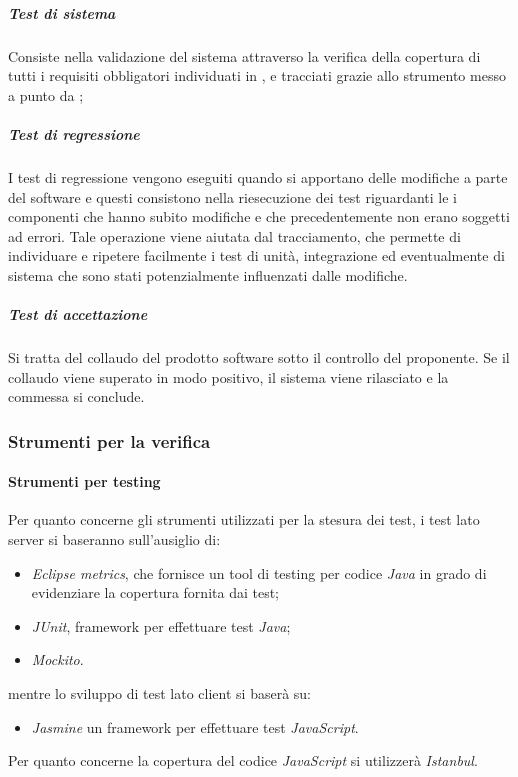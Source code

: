 \subparagraph{Test di sistema}
Consiste nella validazione del sistema attraverso la verifica della copertura di tutti i requisiti obbligatori individuati in \infoAR, e tracciati  grazie allo strumento messo a punto da \gruppo;
\subparagraph{Test di regressione}
I test di regressione vengono eseguiti quando si apportano delle modifiche a parte del software e questi consistono nella riesecuzione dei test riguardanti le i componenti che hanno subito modifiche e che precedentemente non erano soggetti ad errori.
Tale operazione viene aiutata dal tracciamento, che permette di individuare e ripetere facilmente i test di unità, integrazione ed eventualmente di sistema che sono stati potenzialmente influenzati dalle modifiche.
\subparagraph{Test di accettazione}
Si tratta del collaudo del prodotto software sotto il controllo del proponente. Se il collaudo viene superato in modo positivo, il sistema viene rilasciato e la commessa si conclude.
\subsubsection{Strumenti per la verifica}
\paragraph{Strumenti per testing}
Per quanto concerne gli strumenti utilizzati per la stesura dei test, i test lato server si baseranno sull'ausiglio di:
\begin{itemize}
\item \textit{Eclipse metrics}, che fornisce un tool di testing per codice \textit{Java} in grado di evidenziare la copertura fornita dai test;
\item \textit{JUnit}, framework per effettuare test \textit{Java};
\item \textit{Mockito}.
\end{itemize}
mentre lo sviluppo di test lato client si baserà su:
\begin{itemize}
\item \textit{Jasmine} un framework per effettuare test \textit{JavaScript}.
\end{itemize}
Per quanto concerne la copertura del codice \textit{JavaScript} si utilizzerà \textit{Istanbul}.